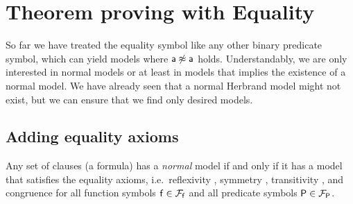 \section{Theorem proving with Equality}\label{sec:theorem:proving:with:equality}

So far we have treated the equality symbol like any other binary predicate symbol,
which can yield models where \( \mathsf{a}\not\approx\mathsf{a} \) holds.
Understandably, we are only interested in normal models or
at least in models that implies the existence of a normal model.
We have already seen that a normal Herbrand model might not exist,
but we can ensure that we find only desired models.

\subsection{Adding equality axioms}\label{sec:equality:axioms}

\begin{theorem}\cite{Harrison:2009:HPL:1540610}
	Any set of clauses (a formula) has a \emph{normal} model
	if and only if it has a model that satisfies the
	{ equality axioms}, 
	i.e.~reflexivity , 
	symmetry , 
	transitivity ,
	and congruence  for all function symbols \( \mathsf{f}\in{\mathcal{F}_{\mathsf{f}}} \)
	and all predicate symbols \( \mathsf{P}\in{\mathcal{F}_{\mathsf{P}}} \).
\end{theorem}


